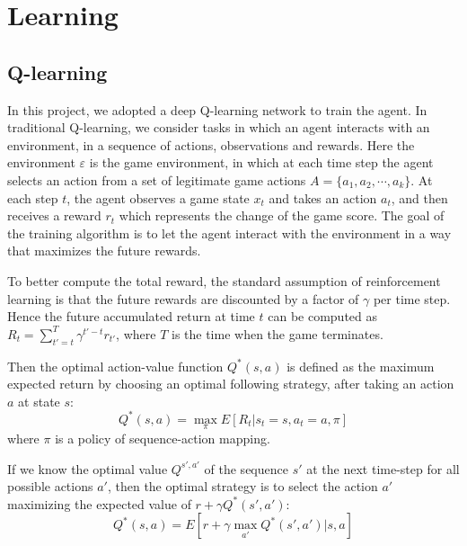 \documentclass{acmsiggraph}
\begin{document}


\section{Learning}
\subsection{Q-learning}
In this project, we adopted a deep Q-learning network to train the agent. 
In traditional Q-learning, we consider tasks in which an agent interacts with an environment, in a sequence of actions, observations and rewards. Here the environment $\varepsilon$ is the game environment, in which at each time step the agent selects an action from a set of legitimate game actions $A = \{a_1, a_2, \cdots, a_k\}$. At each step $t$, the agent observes a game state $x_t$ and takes an action $a_t$, and then receives a reward $r_t$ which represents the change of the game score. The goal of the training algorithm is to let the agent interact with the environment in a way that maximizes the future rewards.

To better compute the total reward, the standard assumption of reinforcement learning is that the future rewards are discounted by a factor of $\gamma$ per time step. Hence the future accumulated return at time $t$ can be computed as $R_t = \sum_{t'=t}^T \gamma^{t'-t} r_{t'}$, where $T$ is the time when the game terminates.

Then the optimal action-value function $Q^{*}(s, a)$ is defined as the maximum expected return by choosing an optimal following strategy, after taking an action $a$ at state $s$:
$$
Q^{*}(s, a) = \max_{\pi} E[R_t | s_t = s, a_t = a, \pi]
$$
where $\pi$ is a policy of sequence-action mapping.

If we know the optimal value $Q^{s', a'}$ of the sequence $s'$ at the next time-step for all possible actions $a'$, then the optimal strategy is to select the action $a'$ maximizing the expected value of $r+\gamma Q^{*}(s', a')$:
$$
Q^{*}(s, a) = E[r + \gamma \max_{a'} Q^{*}(s', a') | s, a]
$$
\end{document}
